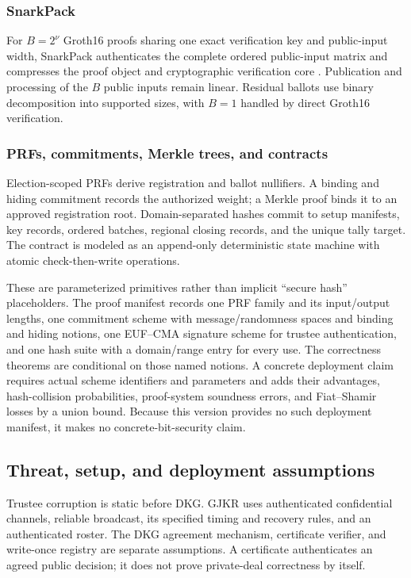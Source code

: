 \documentclass[pdflatex,sn-mathphys-num]{sn-jnl}%
\theoremstyle{thmstyleone}%
\theoremstyle{thmstyletwo}%
\theoremstyle{thmstylethree}%
\begin{document}
\subsubsection{SnarkPack}\label{subsec:snarkpack}
For $B=2^\nu$ Groth16 proofs sharing one exact verification key and public-input
width, SnarkPack authenticates the complete ordered public-input matrix and
compresses the proof object and cryptographic verification core
\cite{bib128}.  Publication and processing of the $B$ public inputs remain
linear.  Residual ballots use binary decomposition into supported sizes, with
$B=1$ handled by direct Groth16 verification.

\subsubsection{PRFs, commitments, Merkle trees, and contracts}
\label{subsec:aux-blocks}
Election-scoped PRFs derive registration and ballot nullifiers.  A binding and
hiding commitment records the authorized weight; a Merkle proof binds it to an
approved registration root.  Domain-separated hashes commit to setup
manifests, key records, ordered batches, regional closing records, and the
unique tally target.  The contract is modeled as an append-only deterministic
state machine with atomic check-then-write operations.

These are parameterized primitives rather than implicit ``secure hash''
placeholders.  The proof manifest records one PRF family and its input/output
lengths, one commitment scheme with message/randomness spaces and binding and
hiding notions, one EUF--CMA signature scheme for trustee authentication, and
one hash suite with a domain/range entry for every use.  The correctness
theorems are conditional on those named notions.  A concrete deployment claim
requires actual scheme identifiers and parameters and adds their advantages,
hash-collision probabilities, proof-system soundness errors, and
Fiat--Shamir losses by a union bound.  Because this version provides no such
deployment manifest, it makes no concrete-bit-security claim.

\subsection{Threat, setup, and deployment assumptions}\label{sec2.3}
\label{subsec:trust-assumptions}

Trustee corruption is static before DKG.  GJKR uses authenticated confidential
channels, reliable broadcast, its specified timing and recovery rules, and an
authenticated roster.  The DKG agreement mechanism, certificate verifier, and
write-once registry are separate assumptions.  A certificate authenticates an
agreed public decision; it does not prove private-deal correctness by itself.
\end{document}
